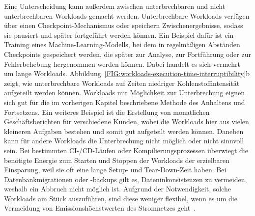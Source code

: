 Eine Unterscheidung kann außerdem zwischen unterbrechbaren und nicht unterbrechbaren Workloads gemacht werden.
Unterbrechbare Workloads verfügen über einen Checkpoint-Mechanismus oder speichern Zwischenergebnisse, sodass sie pausiert und später fortgeführt werden können.
Ein Beispiel dafür ist ein Training eines Machine-Learning-Modells, bei dem in regelmäßigen Abständen Checkpoints gespeichert werden, die später zur Analyse, zur Fortführung oder zur Fehlerbehebung hergenommen werden können.
Dabei handelt es sich vermehrt um lange Workloads.
Abbildung~\ref{FIG:workloads-execution-time-interruptibility}b zeigt, wie unterbrechbare Workloads auf Zeiten niedriger Kohlenstoffintensität aufgeteilt werden können.
Workloads mit Möglichkeit zur Unterbrechung eignen sich gut für die im vorherigen Kapitel beschriebene Methode des Anhaltens und Fortsetzens.
Ein weiteres Beispiel ist die Erstellung von monatlichen Geschäftsberichten für verschiedene Kunden, wobei die Workloads hier aus vielen kleineren Aufgaben bestehen und somit gut aufgeteilt werden können.
Daneben kann für andere Workloads die Unterbrechung nicht möglich oder nicht sinnvoll sein.
Bei bestimmten CI-/CD-Läufen oder Kompilierungsprozessen überwiegt die benötigte Energie zum Starten und Stoppen der Workloads der erzielbaren Einsparung, weil sie oft eine lange Setup- und Tear-Down-Zeit haben.
Bei Datenbankmigrationen oder -backups gilt es, Dateninkonsistenzen zu vermeiden, weshalb ein Abbruch nicht möglich ist.
Aufgrund der Notwendigkeit, solche Workloads am Stück auszuführen, sind diese weniger flexibel, wenn es um die Vermeidung von Emissionshöchstwerten des Stromnetzes geht~\cite{Wiesner.2021}.


